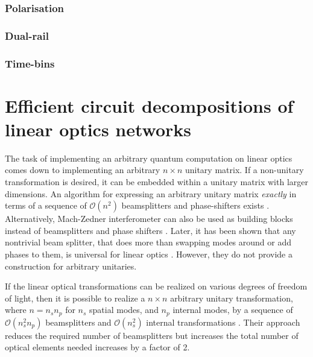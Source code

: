 \documentclass[aps,rmp,twocolumn,amsmath,amssymb,nofootinbib,superscriptaddress]{revtex4}
\begin{document}
\subsubsection{Polarisation}

\subsubsection{Dual-rail}

\subsubsection{Time-bins}




\section{Efficient circuit decompositions of linear optics networks}

The task of implementing an arbitrary quantum computation on linear optics comes down to implementing an arbitrary $n\times n$ unitary matrix. If a non-unitary transformation is desired, it can be embedded within a unitary matrix with larger dimensions. An algorithm for expressing an arbitrary unitary matrix {\it exactly} in terms of a sequence of $\mathcal{O}(n^2)$ beamsplitters and phase-shifters exists \cite{bib:Reck1994}. Alternatively, Mach-Zedner interferometer can also be used as building blocks instead of beamsplitters and phase shifters \cite{bib:Reck1994, bib:Englert2001}. Later, it has been shown that any nontrivial beam splitter, that does more than swapping modes around or add phases to them, is universal for linear optics \cite{bib:Bouland2014}. However, they do not provide a construction for arbitrary unitaries.

If the linear optical transformations can be realized on various degrees of freedom of light, then it is possible to realize a $n\times n$ arbitrary unitary transformation, where $n=n_s n_p$ for $n_s$ spatial modes, and $n_p$ internal modes, by a sequence of $\mathcal{O}(n_s^2 n_p)$ beamsplitters and $\mathcal{O}(n_s^2)$ internal transformations \cite{bib:Dhand2015}. Their approach reduces the required number of beamsplitters but increases the total number of optical elements needed increases by a factor of 2.
\end{document}
